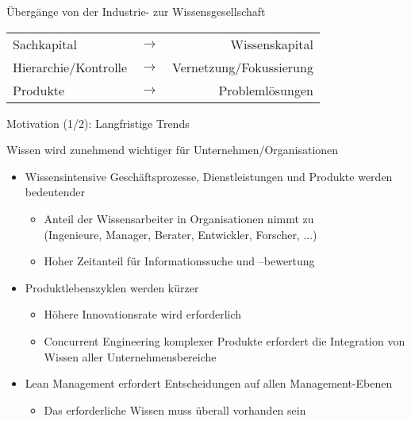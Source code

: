 \documentclass[aspectratio=1610,onlymath]{beamer}
\begin{document}
\begin{frame}{Übergänge von der Industrie- zur Wissensgesellschaft}

\begin{center}
\begin{tabular}{lcr}
Sachkapital & $\rightarrow$ & Wissenskapital \\
Hierarchie/Kontrolle & $\rightarrow$ & Vernetzung/Fokussierung \\  
Produkte & $\rightarrow$ & Problemlösungen
\end{tabular}
\end{center}

\bigskip
{}

\end{frame}


\begin{frame}{Motivation (1/2): Langfristige Trends}

\alert{Wissen wird zunehmend wichtiger für Unternehmen/Organisationen}
\bigskip
\begin{itemize}
\item Wissensintensive Geschäftsprozesse, Dienstleistungen und Produkte werden bedeutender 
	\begin{itemize}
	\item Anteil der Wissensarbeiter in Organisationen nimmt zu \\
	(Ingenieure, Manager, Berater, Entwickler, Forscher, ...)
	\item Hoher Zeitanteil für Informationssuche und –bewertung
	\end{itemize}
\item Produktlebenszyklen werden kürzer
	\begin{itemize}
	\item Höhere Innovationsrate wird erforderlich
	\item Concurrent Engineering komplexer Produkte erfordert die Integration von Wissen aller Unternehmensbereiche
	\end{itemize}
\item Lean Management erfordert Entscheidungen auf allen Management-Ebenen
	\begin{itemize}
	\item Das erforderliche Wissen muss überall vorhanden sein
	\end{itemize}
\end{itemize}

\end{frame}
\end{document}
